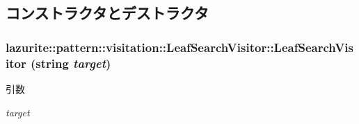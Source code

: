 \subsection{コンストラクタとデストラクタ}
\hypertarget{classlazurite_1_1pattern_1_1visitation_1_1_leaf_search_visitor_a43c3e289d0678c77f4d0fc86caeb72d1}{
\subsubsection[{LeafSearchVisitor}]{\setlength{\rightskip}{0pt plus 5cm}lazurite::pattern::visitation::LeafSearchVisitor::LeafSearchVisitor (string {\em target})}}
\label{classlazurite_1_1pattern_1_1visitation_1_1_leaf_search_visitor_a43c3e289d0678c77f4d0fc86caeb72d1}

\begin{DoxyParams}{引数}
\item[{\em target}]\end{DoxyParams}


